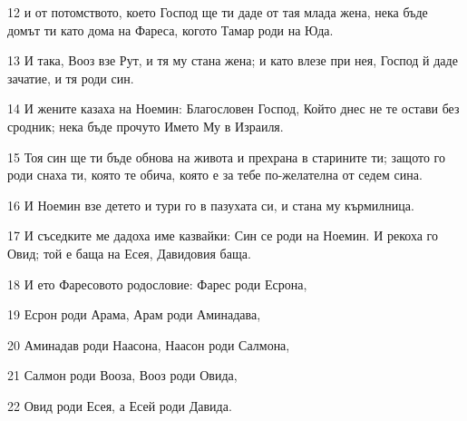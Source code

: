 \par 12 и от потомството, което Господ ще ти даде от тая млада жена, нека бъде домът ти като дома на Фареса, когото Тамар роди на Юда.
\par 13 И така, Вооз взе Рут, и тя му стана жена; и като влезе при нея, Господ й даде зачатие, и тя роди син.
\par 14 И жените казаха на Ноемин: Благословен Господ, Който днес не те остави без сродник; нека бъде прочуто Името Му в Израиля.
\par 15 Тоя син ще ти бъде обнова на живота и прехрана в старините ти; защото го роди снаха ти, която те обича, която е за тебе по-желателна от седем сина.
\par 16 И Ноемин взе детето и тури го в пазухата си, и стана му кърмилница.
\par 17 И съседките ме дадоха име казвайки: Син се роди на Ноемин. И рекоха го Овид; той е баща на Есея, Давидовия баща.
\par 18 И ето Фаресовото родословие: Фарес роди Есрона,
\par 19 Есрон роди Арама, Арам роди Аминадава,
\par 20 Аминадав роди Наасона, Наасон роди Салмона,
\par 21 Салмон роди Вооза, Вооз роди Овида,
\par 22 Овид роди Есея, а Есей роди Давида.


